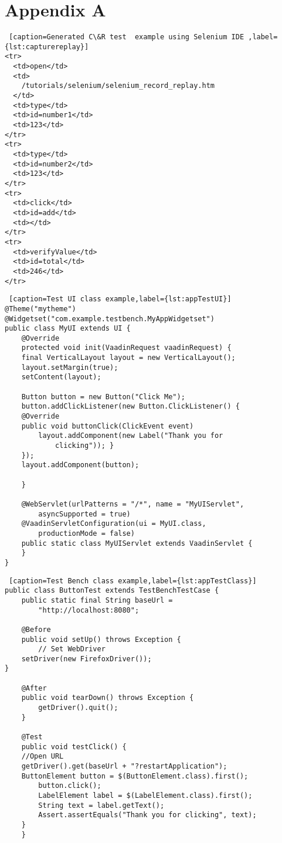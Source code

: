 	
\appendix
\section{Appendix A}
\label{appendixA}

\lstset{style=console}
\begin{lstlisting} [caption=Generated C\&R test  example using Selenium IDE ,label={lst:capturereplay}]
<tr> 
  <td>open</td>
  <td>
    /tutorials/selenium/selenium_record_replay.htm
  </td>
  <td>type</td>
  <td>id=number1</td>
  <td>123</td>
</tr>
<tr>
  <td>type</td>
  <td>id=number2</td>
  <td>123</td>
</tr>
<tr>
  <td>click</td>
  <td>id=add</td>
  <td></td>
</tr>
<tr>
  <td>verifyValue</td>
  <td>id=total</td>
  <td>246</td>
</tr>
\end{lstlisting}
	 
\lstset{style=a1listing}
\begin{lstlisting} [caption=Test UI class example,label={lst:appTestUI}]
@Theme("mytheme")
@Widgetset("com.example.testbench.MyAppWidgetset")
public class MyUI extends UI {
	@Override
	protected void init(VaadinRequest vaadinRequest) {
	final VerticalLayout layout = new VerticalLayout();
	layout.setMargin(true);
	setContent(layout);

	Button button = new Button("Click Me");
	button.addClickListener(new Button.ClickListener() {
	@Override
	public void buttonClick(ClickEvent event) 
		layout.addComponent(new Label("Thank you for
			clicking")); }
	});
	layout.addComponent(button);

	}
    
	@WebServlet(urlPatterns = "/*", name = "MyUIServlet",
		asyncSupported = true)
	@VaadinServletConfiguration(ui = MyUI.class,
		productionMode = false)
	public static class MyUIServlet extends VaadinServlet {
	}
}
\end{lstlisting}

\lstset{style=a1listing}
\begin{lstlisting} [caption=Test Bench class example,label={lst:appTestClass}]
public class ButtonTest extends TestBenchTestCase {
	public static final String baseUrl =
		"http://localhost:8080";
    
	@Before
	public void setUp() throws Exception {
		// Set WebDriver
	setDriver(new FirefoxDriver());
}

	@After
	public void tearDown() throws Exception {
		getDriver().quit();
	}
    
	@Test
	public void testClick() {
	//Open URL
	getDriver().get(baseUrl + "?restartApplication");
	ButtonElement button = $(ButtonElement.class).first();
		button.click();
		LabelElement label = $(LabelElement.class).first();
		String text = label.getText();
		Assert.assertEquals("Thank you for clicking", text);
	}
    }
\end{lstlisting}


